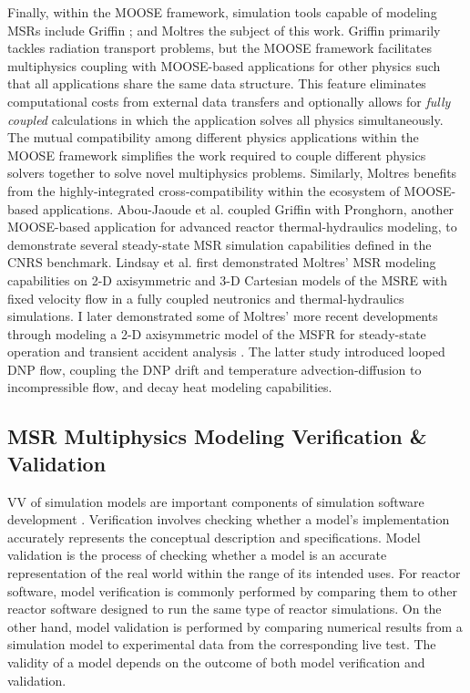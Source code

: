 Finally, within the \gls{MOOSE} framework, simulation tools capable of modeling
\glspl{MSR} include Griffin \cite{abou-jaoude_coupled_2020}; and Moltres
\cite{lindsay_moltres_2017}\textemdash the subject of this work.
Griffin primarily tackles radiation transport problems, but the \gls{MOOSE}
framework facilitates multiphysics coupling with \gls{MOOSE}-based applications for other physics
such that all applications share the same data structure. This feature eliminates
computational costs from external data transfers and optionally allows for
\textit{fully coupled} calculations in which the application solves all physics
simultaneously. The mutual compatibility among different physics applications within the
\gls{MOOSE} framework simplifies the work required to couple
different physics solvers together to solve novel multiphysics problems. Similarly,
Moltres benefits from the highly-integrated cross-compatibility
within the ecosystem of \gls{MOOSE}-based applications. Abou-Jaoude et al.
\cite{abou-jaoude_coupled_2020} coupled Griffin with Pronghorn, another
\gls{MOOSE}-based application for advanced reactor thermal-hydraulics modeling, to
demonstrate several steady-state \gls{MSR} simulation capabilities defined in
the CNRS benchmark. Lindsay et al.
\cite{lindsay_introduction_2018} first demonstrated Moltres' \gls{MSR} modeling
capabilities on 2-D axisymmetric and 3-D Cartesian models of the \gls{MSRE} with
fixed velocity flow in a fully coupled neutronics and thermal-hydraulics simulations.
I later demonstrated some of Moltres' more recent developments through
modeling a 2-D axisymmetric model of the \gls{MSFR} for steady-state operation
and transient accident analysis \cite{park_advancement_2020}. The latter study
introduced looped \gls{DNP} flow, coupling the \gls{DNP} drift and temperature 
advection-diffusion to incompressible flow, and decay heat modeling
capabilities.

\subsection{MSR Multiphysics Modeling Verification \& Validation} \label{sec:msr-vv}

\Gls{VV} of simulation models are important components of simulation software development
\cite{sargent_verification_2010}. Verification involves checking whether a model's implementation
accurately represents the conceptual description and specifications. Model
validation is the process of checking whether a model is an accurate representation of the real
world within the range of its intended uses. For reactor software, model verification is commonly
performed by comparing them to other reactor software designed to run the same type of reactor
simulations. On the other hand, model validation is performed by comparing numerical results from
a simulation model to experimental data from the corresponding live test. The validity of a model
depends on the outcome of both model verification and validation.

